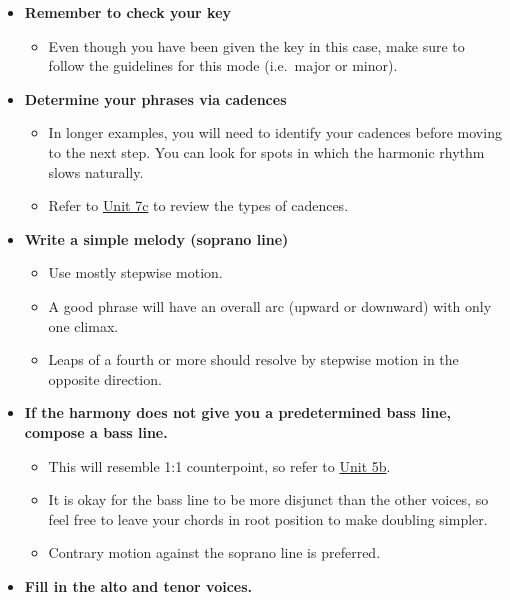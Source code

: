 \documentclass{book}
\providecommand{\tightlist}{%
  \setlength{\itemsep}{0pt}\setlength{\parskip}{0pt}}
\begin{document}
\begin{itemize}
\tightlist
\item
  \textbf{Remember to check your key}

  \begin{itemize}
  \tightlist
  \item
    Even though you have been given the key in this case, make sure to follow
    the guidelines for this mode (i.e.~major or minor).
  \end{itemize}
\item
  \textbf{Determine your phrases via cadences}

  \begin{itemize}
  \tightlist
  \item
    In longer examples, you will need to identify your cadences before moving
    to the next step. You can look for spots in which the harmonic rhythm
    slows naturally.
  \item
    Refer to \href{07-harmonic-functions/c1-cadences.html}{Unit 7c} to review
    the types of cadences.
  \end{itemize}
\item
  \textbf{Write a simple melody (soprano line)}

  \begin{itemize}
  \tightlist
  \item
    Use mostly stepwise motion.
  \item
    A good phrase will have an overall arc (upward or downward) with only one
    climax.
  \item
    Leaps of a fourth or more should resolve by stepwise motion in the
    opposite direction.
  \end{itemize}
\item
  \textbf{If the harmony does not give you a predetermined bass line, compose
  a bass line.}

  \begin{itemize}
  \tightlist
  \item
    This will resemble 1:1 counterpoint, so refer to
    \href{05-counterpoint-embell-shapes/b1-cantfirmand1st.html}{Unit 5b}.
  \item
    It is okay for the bass line to be more disjunct than the other voices, so
    feel free to leave your chords in root position to make doubling simpler.
  \item
    Contrary motion against the soprano line is preferred.
  \end{itemize}
\item
  \textbf{Fill in the alto and tenor voices.}


\end{itemize}
\end{document}
